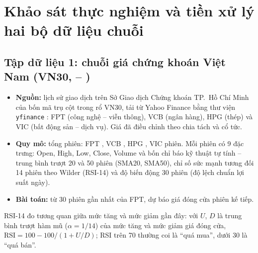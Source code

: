 
\section{Khảo sát thực nghiệm và tiền xử lý hai bộ dữ liệu chuỗi}

\subsection{Tập dữ liệu 1: chuỗi giá chứng khoán Việt Nam (VN30,  -- )}

\begin{itemize}
  \item \textbf{Nguồn:} lịch sử giao dịch trên Sở Giao dịch Chứng khoán TP.~Hồ Chí Minh của bốn mã trụ cột trong rổ VN30,
    tải từ Yahoo Finance bằng thư viện \texttt{yfinance} \cite{yfinance}: FPT (công nghệ -- viễn thông), VCB (ngân hàng),
    HPG (thép) và VIC (bất động sản -- dịch vụ). Giá đã điều chỉnh theo chia tách và cổ tức.
  \item \textbf{Quy mô:} tổng  phiên: FPT , VCB ,
    HPG , VIC  phiên. Mỗi phiên có 9 đặc trưng: Open, High, Low, Close, Volume và
    bốn chỉ báo kỹ thuật tự tính -- trung bình trượt 20 và 50 phiên (SMA20, SMA50), chỉ số sức mạnh tương đối 14 phiên theo
    Wilder (RSI-14) và độ biến động 30 phiên (độ lệch chuẩn lợi suất ngày).
  \item \textbf{Bài toán:} từ 30 phiên gần nhất của FPT, dự báo giá đóng cửa phiên kế tiếp.
\end{itemize}

RSI-14 đo tương quan giữa mức tăng và mức giảm gần đây: với $U$, $D$ là trung bình trượt hàm mũ ($\alpha = 1/14$) của mức tăng
và mức giảm giá đóng cửa, $\mathrm{RSI} = 100 - 100/(1 + U/D)$; RSI trên 70 thường coi là “quá mua”, dưới 30 là “quá bán”.




